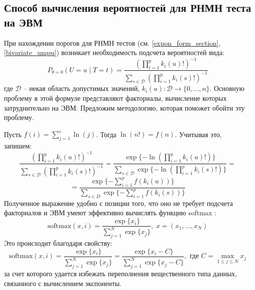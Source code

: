 \subsection{Способ вычисления вероятностей для РНМН теста
на ЭВМ}
При нахождении порогов для РНМН тестов
(см. \autoref{expon_form_section}, \autoref{bivariate_umpu})
возникает необходимость
подсчета вероятностей вида:
$$P_{\theta=0}(U=u \mid T=t)=\dfrac{(\prod_{i=1}^p k_i(u)!)^{-1}}
            {\sum_{s\in \mathcal{D}} (\prod_{i=1}^p k_i(s)!)^{-1}}$$
где $\mathcal{D}$ -- некая область допустимых значений,
$k_i(u):\mathcal{D} \to \{0,\ldots,n\}$.
Основную проблему в этой формуле представляют 
факториалы, вычисление которых затруднительно на ЭВМ. 
Предложим методологию, которая поможет обойти эту проблему.

    Пусть $f(i)=\sum_{j=1}^{i} \ln(j)$. Тогда $\ln(n!)=f(n)$.
    Учитывая это, запишем:
    $$
    \dfrac{(\prod_{i=1}^p k_i(u)!)^{-1}}
            {\sum_{s\in \mathcal{D}} (\prod_{i=1}^p k_i(s)!)^{-1}}=
    \dfrac{\exp\{-\ln(\prod_{i=1}^p k_i(u)!)\}}
    {\sum_{s\in \mathcal{D}} \exp \{-\ln(\prod_{i=1}^p k_i(s)!)\}}=
    $$
    $$
    = \dfrac{\exp \{ -\sum_{i=1}^p f(k_i(u)) \}}
    {\sum_{s \in D} \exp \{ -\sum_{i=1}^p f(k_i(s)) \}}
    $$
Полученное выражение удобно с позиции того, что оно не требует подсчета факториалов и ЭВМ умеют 
эффективно вычислять функцию softmax \cite{softmax}:
$$
\text{softmax}(x,i)=\dfrac{\exp\{x_i\}}{\sum_{j=1}^{N} \exp\{x_j\}}, \; x=(x_1,\ldots,x_N)
$$
Это происходит благодаря свойству:
$$
\text{softmax}(x,i)=\dfrac{\exp\{x_i\}}{\sum_{j=1}^{N} \exp\{x_j\}} = \dfrac{\exp\{x_i - C\}}{\sum_{j=1}^{N} \exp\{x_j - C\}}
, \text{ где } C=\max_{1\leq j \leq N} x_j
$$
за счет которого удается избежать переполнения вещественного типа данных, 
связанного с вычислением экспоненты.
